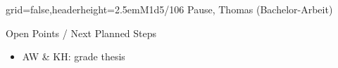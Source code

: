 \documentclass[english]{kiesgrube}
\begin{document}
\begin{poster}{grid=false,headerheight=2.5em}{}{M1d5/106 Pause, Thomas (Bachelor-Arbeit)}{}{}
\begin{posterbox}[name=open,column=1,below=description]{Open Points / Next Planned Steps}
\begin{itemize}
\item AW \& KH: grade thesis
\end{itemize}
\end{posterbox}
\footer{}
\end{poster}

\newpage
\end{document}
